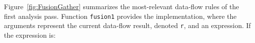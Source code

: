 \documentclass{sigplanconf}  %
\newcommand{\emp}[1]{\textcolor{DikuRed}{ #1}}
\newcommand{\emphh}[1]{\textcolor{CosGreen}{ #1}}
\begin{document}

%


Figure~\ref{fig:FusionGather} summarizes the most-relevant data-flow rules
of the first analysis pass. Function {\tt fusion1} provides the implementation,
where the arguments represent the current data-flow result, denoted {\tt r}, and an 
expression.   If the expression is:
\end{document}
